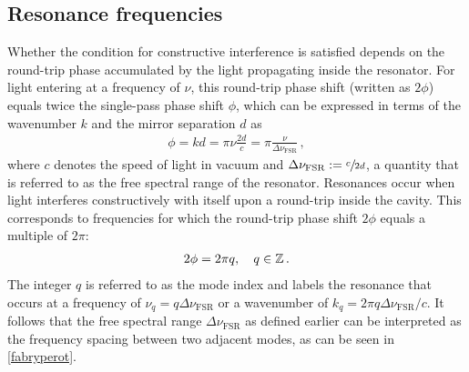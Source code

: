 \documentclass[../Thesis-IJspeert.tex]{subfiles}
\begin{document}
\subsection{Resonance frequencies}
Whether the condition for constructive interference is satisfied depends on the round-trip phase accumulated by the light propagating inside the resonator. For light entering at a frequency of $\nu$, this round-trip phase shift (written as $2\phi$) equals twice the single-pass phase shift $\phi$, which can be expressed in terms of the wavenumber $k$ and the mirror separation $d$ as
\begin{align}
\label{phiairy}
\phi=kd=\pi\nu\frac{2d}{c}=\pi\frac{\nu}{\Delta\nu_\mathrm{FSR}}\,,
\end{align}
where $c$ denotes the speed of light in vacuum and $\Delta\nu_\mathrm{FSR}:=\sfrac{c}{2d}$, a quantity that is referred to as the free spectral range of the resonator. Resonances occur when light interferes constructively with itself upon a round-trip inside the cavity. This corresponds to frequencies for which the round-trip phase shift $2\phi$ equals a multiple of $2\pi$:
\begin{align}
\label{rescondition}
2\phi=2\pi q,\quad q \in \mathbb{Z}\,.
\end{align}
The integer $q$ is referred to as the mode index and labels the resonance that occurs at a frequency of $\nu_q=q\Delta\nu_\mathrm{FSR}$ or a wavenumber of $k_q=2\pi q \Delta\nu_\mathrm{FSR}/c$. It follows that the free spectral range $\Delta\nu_\mathrm{FSR}$ as defined earlier can be interpreted as the frequency spacing between two adjacent modes, as can be seen in \autoref{fabryperot}.
\end{document}
